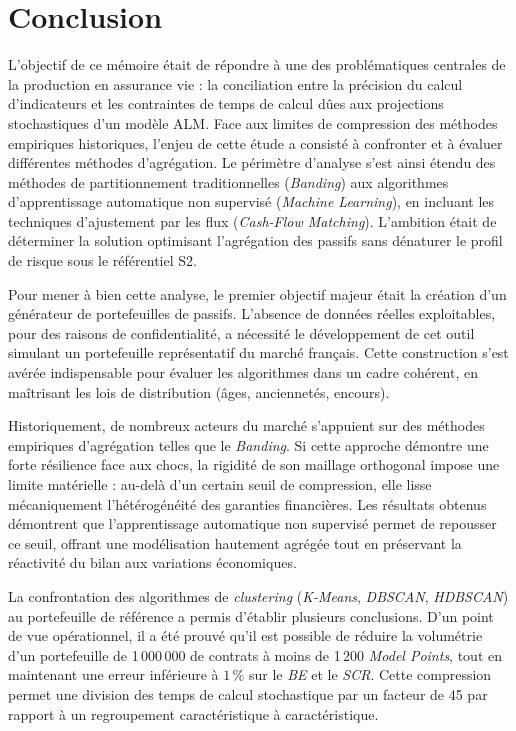 \chapter*{Conclusion}
\label{chap:conclusion}

L'objectif de ce mémoire était de répondre à une des problématiques centrales de la production en assurance vie : la conciliation entre la précision du calcul d'indicateurs et les contraintes de temps de calcul dûes aux projections stochastiques d'un modèle ALM. Face aux limites de compression des méthodes empiriques historiques, l'enjeu de cette étude a consisté à confronter et à évaluer différentes méthodes d'agrégation. Le périmètre d'analyse s'est ainsi étendu des méthodes de partitionnement traditionnelles (\textit{Banding}) aux algorithmes d'apprentissage automatique non supervisé (\textit{Machine Learning}), en incluant les techniques d'ajustement par les flux (\textit{Cash-Flow Matching}). L'ambition était de déterminer la solution optimisant l'agrégation des passifs sans dénaturer le profil de risque sous le référentiel S2.

Pour mener à bien cette analyse, le premier objectif majeur était la création d'un générateur de portefeuilles de passifs. L'absence de données réelles exploitables, pour des raisons de confidentialité, a nécessité le développement de cet outil simulant un portefeuille représentatif du marché français. Cette construction s'est avérée indispensable pour évaluer les algorithmes dans un cadre cohérent, en maîtrisant les lois de distribution (âges, anciennetés, encours).

Historiquement, de nombreux acteurs du marché s'appuient sur des méthodes empiriques d'agrégation telles que le \textit{Banding}. Si cette approche démontre une forte résilience face aux chocs, la rigidité de son maillage orthogonal impose une limite matérielle : au-delà d'un certain seuil de compression, elle lisse mécaniquement l'hétérogénéité des garanties financières. Les résultats obtenus démontrent que l'apprentissage automatique non supervisé permet de repousser ce seuil, offrant une modélisation hautement agrégée tout en préservant la réactivité du bilan aux variations économiques.

La confrontation des algorithmes de \textit{clustering} (\textit{K-Means}, \textit{DBSCAN}, \textit{HDBSCAN}) au portefeuille de référence a permis d'établir plusieurs conclusions. D'un point de vue opérationnel, il a été prouvé qu'il est possible de réduire la volumétrie d'un portefeuille de 1\,000\,000 de contrats à moins de 1\,200 \textit{Model Points}, tout en maintenant une erreur inférieure à $1\,\%$ sur le \textit{BE} et le \textit{SCR}. Cette compression permet une division des temps de calcul stochastique par un facteur de 45 par rapport à un regroupement caractéristique à caractéristique.

